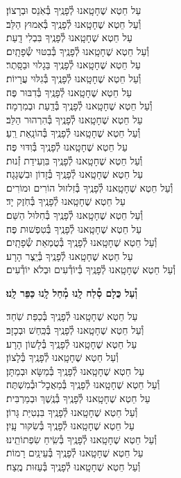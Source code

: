 \documentclass[twoside, openany, parskip=half, 11pt]{book}
\begin{document}
עַל חֵטְא שֶׁחָטָֽאנוּ לְ֯פָנֶֽיךָ בְּ֯אֹֽנֵס וּבְרָצוֹן׃\\ וְ֯עַל חֵטְא שֶׁחָטָֽאנוּ לְ֯פָנֶֽיךָ בְּ֯אִמוּץ הַלֵּב׃ \\
עַל חֵטְא שֶׁחָטָֽאנוּ לְ֯פָנֶֽיךָ בִּבְלִי דָֽעַת׃ \\ וְ֯עַל חֵטְא שֶׁחָטָֽאנוּ לְ֯פָנֶֽיךָ בְּ֯בִטּוּי שְׂ֯פָתָֽיִם׃\\
עַל חֵטְא שֶׁחָטָֽאנוּ לְ֯פָנֶֽיךָ בַּגָלוּי וּבַסָּֽתֶר׃ \\ וְ֯עַל חֵטְא שֶׁחָטָֽאנוּ לְ֯פָנֶֽיךָ בְּ֯גִלּוּי עֲרָיוֹת׃ \\
עַל חֵטְא שֶׁחָטָֽאנוּ לְ֯פָנֶֽיךָ בְּ֯דִבּוּר פֶּה׃ \\ וְ֯עַל חֵטְא שֶׁחָטָֽאנוּ לְ֯פָנֶֽיךָ בְּ֯דַֽעַת וּבְמִרְמָה׃ \\
עַל חֵטְא שֶׁחָטָֽאנוּ לְ֯פָנֶֽיךָ בְּ֯הִרְהוּר הַלֵּב׃ \\ וְ֯עַל חֵטְא שֶׁחָטָֽאנוּ לְ֯פָנֶֽיךָ בְּ֯הוֹנָֽאַת רֵֽעַ׃ \\
עַל חֵטְא שֶׁחָטָֽאנוּ לְ֯פָנֶֽיךָ בְּ֯וִדּוּי פֶּה׃\\ וְ֯עַל חֵטְא שֶׁחָטָֽאנוּ לְ֯פָנֶֽיךָ בִּוְעִידַת זְ֯נוּת׃ \\
עַל חֵטְא שֶׁחָטָֽאנוּ לְ֯פָנֶֽיךָ בְּ֯זָדוֹן וּבִשְׁגָגָה׃ \\ וְ֯עַל חֵטְא שֶׁחָטָֽאנוּ לְ֯פָנֶֽיךָ בְּ֯זִלזוּל הוֹרִים וּמוֹרִים׃\\
עַל חֵטְא שֶׁחָטָֽאנוּ לְ֯פָנֶֽיךָ בְּ֯חֹֽזֶק יָד׃ \\ וְ֯עַל חֵטְא שֶׁחָטָֽאנוּ לְ֯פָנֶֽיךָ בְּ֯חִלּוּל הַשֵּׁם׃ \\
עַל חֵטְא שֶׁחָטָֽאנוּ לְ֯פָנֶֽיךָ בְּ֯טִפְשׁוּת פֶּה׃ \\ וְ֯עַל חֵטְא שֶׁחָטָֽאנוּ לְ֯פָנֶֽיךָ בְּ֯טֻמְאַת שְׂ֯פָתָֽיִם׃ \\
עַל חֵטְא שֶׁחָטָֽאנוּ לְ֯פָנֶֽיךָ בְּ֯יֵֽצֶר הָרָע׃ \\ וְ֯עַל חֵטְא שֶׁחָטָֽאנוּ לְ֯פָנֶֽיךָ בְּ֯יוֹדְ֯עִים וּבְלֹא יוֹדְ֯עִים׃

\textbf{וְ֯עַל כֻּלָם סְ֯לַח לָֽנוּ מְ֯חַל לָֽנוּ כַּפֵּר לָֽנוּ׃}

עַל חֵטְא שֶׁחָטָֽאנוּ לְ֯פָנֶֽיךָ בְּ֯כַפַּת שֹֽׁחַד׃ \\ וְ֯עַל חֵטְא שֶׁחָטָֽאנוּ לְ֯פָנֶֽיךָ בְּ֯כַּֽחַשׁ וּבְכָזָב׃ \\
עַל חֵטְא שֶׁחָטָֽאנוּ לְ֯פָנֶֽיךָ בְּ֯לָשׁוֹן הָרָע׃\\ וְ֯עַל חֵטְא שֶׁחָטָֽאנוּ לְ֯פָנֶֽיךָ בְּ֯לָצוֹן׃\\
עַל חֵטְא שֶׁחָטָֽאנוּ לְ֯פָנֶֽיךָ בְּ֯מַשָּׂא וּבְמַתָּן׃ \\ וְ֯עַל חֵטְא שֶׁחָטָֽאנוּ לְ֯פָנֶֽיךָ בְּ֯מַאֲכׇל־וּבְ֯מִשְׁתֶּה׃\\
עַל חֵטְא שֶׁחָטָֽאנוּ לְ֯פָנֶֽיךָ בְּ֯נֶֽשֶׁךְ וּבְמַרְבִּית׃\\ וְ֯עַל חֵטְא שֶׁחָטָֽאנוּ לְ֯פָנֶֽיךָ בִּנְטִיַּת גָּרוֹן׃ \\
עַל חֵטְא שֶׁחָטָֽאנוּ לְ֯פָנֶֽיךָ בְּ֯שִׂקּוּר עָֽיִן׃\\ וְ֯עַל חֵטְא שֶׁחָטָֽאנוּ לְ֯פָנֶֽיךָ בְּ֯שִֽׂיחַ שִׂפְתוֹתֵֽינוּ׃ \\
עַל חֵטְא שֶׁחָטָֽאנוּ לְ֯פָנֶֽיךָ בְּ֯עֵינַֽיִם רָמוֹת׃\\ וְ֯עַל חֵטְא שֶׁחָטָֽאנוּ לְ֯פָנֶֽיךָ בְּ֯עַזּוּת מֶֽצַח׃
\end{document}
